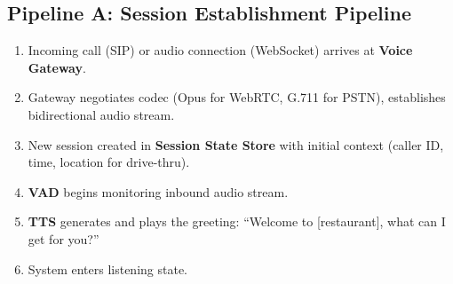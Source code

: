 \subsection*{Pipeline A: Session Establishment Pipeline}
\begin{enumerate}
  \item Incoming call (SIP) or audio connection (WebSocket) arrives at \textbf{Voice Gateway}.
  \item Gateway negotiates codec (Opus for WebRTC, G.711 for PSTN), establishes bidirectional audio stream.
  \item New session created in \textbf{Session State Store} with initial context (caller ID, time, location for drive-thru).
  \item \textbf{VAD} begins monitoring inbound audio stream.
  \item \textbf{TTS} generates and plays the greeting: ``Welcome to [restaurant], what can I get for you?''
  \item System enters listening state.
\end{enumerate}


